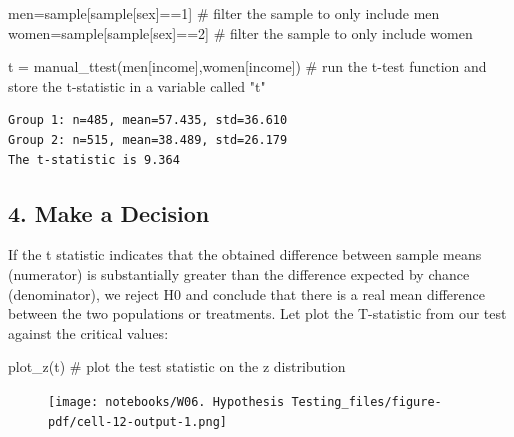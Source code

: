 \documentclass[
  letterpaper,
  DIV=11,
  numbers=noendperiod]{scrreprt}
\newenvironment{Shaded}{\begin{snugshade}}{\end{snugshade}}
\newcommand{\CommentTok}[1]{\textcolor[rgb]{0.37,0.37,0.37}{#1}}
\newcommand{\DecValTok}[1]{\textcolor[rgb]{0.68,0.00,0.00}{#1}}
\newcommand{\NormalTok}[1]{\textcolor[rgb]{0.00,0.23,0.31}{#1}}
\newcommand{\OperatorTok}[1]{\textcolor[rgb]{0.37,0.37,0.37}{#1}}
\newcommand{\StringTok}[1]{\textcolor[rgb]{0.13,0.47,0.30}{#1}}
\begin{document}
\begin{Shaded}
\begin{Highlighting}[]
\NormalTok{men}\OperatorTok{=}\NormalTok{sample[sample[}\StringTok{\textquotesingle{}sex\textquotesingle{}}\NormalTok{]}\OperatorTok{==}\DecValTok{1}\NormalTok{] }\CommentTok{\# filter the sample to only include men}
\NormalTok{women}\OperatorTok{=}\NormalTok{sample[sample[}\StringTok{\textquotesingle{}sex\textquotesingle{}}\NormalTok{]}\OperatorTok{==}\DecValTok{2}\NormalTok{] }\CommentTok{\# filter the sample to only include women}

\NormalTok{t }\OperatorTok{=}\NormalTok{ manual\_ttest(men[}\StringTok{\textquotesingle{}income\textquotesingle{}}\NormalTok{],women[}\StringTok{\textquotesingle{}income\textquotesingle{}}\NormalTok{]) }\CommentTok{\# run the t{-}test function and store the t{-}statistic in a variable called "t"}
\end{Highlighting}
\end{Shaded}

\begin{verbatim}
Group 1: n=485, mean=57.435, std=36.610
Group 2: n=515, mean=38.489, std=26.179
The t-statistic is 9.364
\end{verbatim}

\hypertarget{make-a-decision}{%
\subsection{4. Make a Decision}\label{make-a-decision}}

If the t statistic indicates that the obtained difference between sample
means (numerator) is substantially greater than the difference expected
by chance (denominator), we reject H0 and conclude that there is a real
mean difference between the two populations or treatments. Let plot the
T-statistic from our test against the critical values:

\begin{Shaded}
\begin{Highlighting}[]
\NormalTok{plot\_z(t) }\CommentTok{\# plot the test statistic on the z distribution}
\end{Highlighting}
\end{Shaded}

\begin{figure}[H]

{\centering \texttt{[image: notebooks/W06. Hypothesis Testing\_files/figure-pdf/cell-12-output-1.png]}

}

\end{figure}
\end{document}
